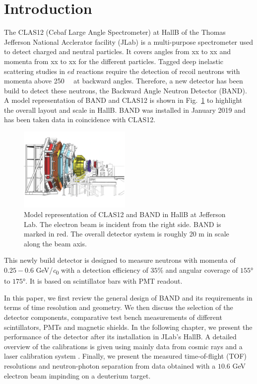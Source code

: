 \documentclass[3p,final,twocolumn]{elsarticle}
\begin{document}
\linenumbers


\setcounter{footnote}{0}
\renewcommand{\thefootnote}{\alph{footnote}}
\section{Introduction}


The CLAS12 (Cebaf Large Angle Spectrometer) \cite{Burkert:2020akg} at HallB of the Thomas Jefferson National Acclerator facility (JLab) is a multi-purpose spectrometer used to detect charged and neutral particles. It covers angles from xx to xx and momenta from xx to xx for the different particles. 
Tagged deep inelastic scattering studies in $ed$ reactions require the detection of recoil neutrons with momenta above \SI{250}{\mega\eVperc} at backward angles. Therefore, a new detector has been build to detect these neutrons, the Backward Angle Neutron Detector (BAND). A model representation of BAND and CLAS12 is shown in Fig.~\ref{fig:clas12band} to highlight the overall layout and scale in HallB. BAND was installed in January 2019 and has been taken data in coincidence with CLAS12.

\begin{figure}[t!]
	\centering
	\includegraphics[width=0.48\textwidth]{BandInClas.pdf}
		\caption{Model representation of CLAS12 and BAND in HallB at Jefferson Lab. The electron beam is incident from the right side. BAND is marked in red. The overall detector system is roughly 20 \si{\meter} in scale along the beam axis. }
		\label{fig:clas12band}
\end{figure}

This newly build detector is designed to measure neutrons with momenta of $0.25 - 0.6$ \si{\GeV/\clight} with a detection efficiency of $35$\%  and angular coverage of $155$\si{\degree} to $175$\si{\degree}. It is based on scintillator bars with PMT readout. 

In this paper, we first review the general design of BAND and its requirements in terms of time resolution and geometry. We then discuss the selection of the detector components,
comparative test bench measurements of different scintillators, PMTs and magnetic shields. In the following chapter, we present the performance of the detector after its installation in JLab's HallB. A detailed overview of the calibrations is given using mainly data from cosmic rays and a laser calibration system \cite{band-laser}. Finally, we present the measured time-of-flight (TOF) resolutions and neutron-photon separation from  data obtained with a $10.6$ \si{\GeV} electron beam impinding on a deuterium target.
\end{document}
